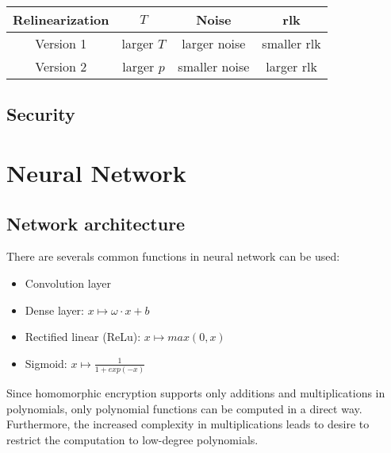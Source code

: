 \documentclass[A4paper,12pt]{article}
\begin{document}
\begin{table}[ht] 
	\label{tab:tbCmpRLK2}
	\centering      %
	\begin{tabular}{|c|c|c|c|}  %
		\hline                      %
		Relinearization & $T$ & Noise & rlk \\ [0.5ex] %
		\hline            %
		Version 1 & larger $T$ & larger noise & smaller rlk \\   %
		\hline 
		Version 2 & larger $p$ & smaller noise & larger rlk \\ [1ex]       %
		
		\hline     %
	\end{tabular} 
	\label{table:nonlin}  %
\end{table}

\subsection{Security}


\section{Neural Network}

	\subsection{Network architecture}

There are severals common functions in neural network can be used:
\begin{itemize}
	\item Convolution layer
	\item Dense layer: $x \mapsto \omega \cdot x + b$
	\item Rectified linear (ReLu): $x \mapsto max(0, x)$
	\item Sigmoid: $x \mapsto \frac{1}{1 + exp(-x)}$
\end{itemize}

Since homomorphic encryption supports only additions and multiplications in polynomials, only polynomial functions can be computed in a direct way. Furthermore, the increased complexity in multiplications leads to desire to restrict the computation to low-degree polynomials.
\end{document}
